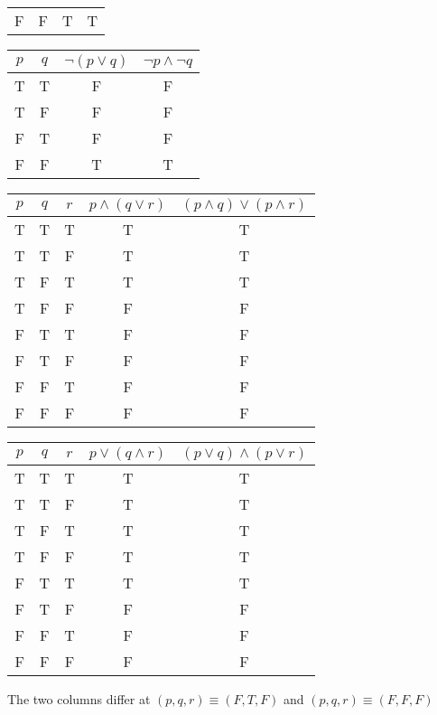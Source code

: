 \documentclass{article}
\begin{document}
\begin{outline}[enumerate]
\begin{tabular}{c | c | c | c}
            F & F & T & T \\
        \end{tabular}
        \2 \begin{tabular}{c | c | c | c}
            $p$ & $q$ & $\neg (p \vee q)$ & $\neg p \wedge \neg q$  \\
            \hline
            T & T & F & F \\
            T & F & F & F \\
            F & T & F & F \\
            F & F & T & T \\
        \end{tabular}
    \1
        \2 \begin{tabular}{c | c | c | c | c}
            $p$ & 
            $q$ & 
            $r$ & 
            $p \wedge (q \vee r)$ & 
            $(p \wedge q) \vee (p \wedge r)$ \\ 
            \hline
            T & T & T & T & T \\
            T & T & F & T & T \\
            T & F & T & T & T \\
            T & F & F & F & F \\
            F & T & T & F & F \\
            F & T & F & F & F \\
            F & F & T & F & F \\
            F & F & F & F & F \\
        \end{tabular}
        \2 \begin{tabular}{c | c | c | c | c }
            $p$ & 
            $q$ & 
            $r$ & 
            $p \vee (q \wedge r)$ & 
            $(p \vee q) \wedge (p \vee r)$ \\ 
            \hline
            T & T & T & T & T \\
            T & T & F & T & T \\
            T & F & T & T & T \\
            T & F & F & T & T \\
            F & T & T & T & T \\
            F & T & F & F & F \\
            F & F & T & F & F \\
            F & F & F & F & F \\
        \end{tabular}
    \1
        \2 The two columns differ at $(p, q, r) \equiv (F, T, F)$ and $(p, q, r) \equiv (F, F, F)$ \\

\end{outline}
\end{document}
